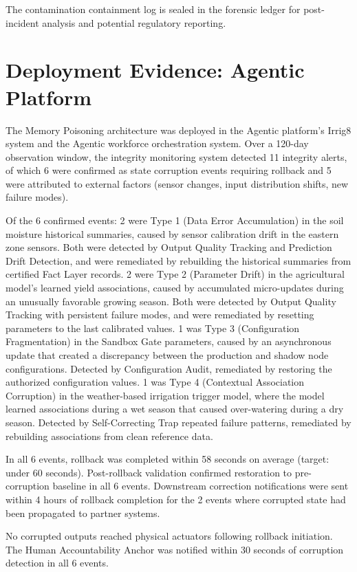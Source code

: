 \documentclass[12pt]{article}
\begin{document}
The contamination containment log is sealed in the forensic ledger for post-incident analysis and potential regulatory reporting.

\section{Deployment Evidence: Agentic Platform}
The Memory Poisoning architecture was deployed in the Agentic platform's Irrig8 system and the Agentic workforce orchestration system. Over a 120-day observation window, the integrity monitoring system detected 11 integrity alerts, of which 6 were confirmed as state corruption events requiring rollback and 5 were attributed to external factors (sensor changes, input distribution shifts, new failure modes).

Of the 6 confirmed events: 2 were Type 1 (Data Error Accumulation) in the soil moisture historical summaries, caused by sensor calibration drift in the eastern zone sensors. Both were detected by Output Quality Tracking and Prediction Drift Detection, and were remediated by rebuilding the historical summaries from certified Fact Layer records. 2 were Type 2 (Parameter Drift) in the agricultural model's learned yield associations, caused by accumulated micro-updates during an unusually favorable growing season. Both were detected by Output Quality Tracking with persistent failure modes, and were remediated by resetting parameters to the last calibrated values. 1 was Type 3 (Configuration Fragmentation) in the Sandbox Gate parameters, caused by an asynchronous update that created a discrepancy between the production and shadow node configurations. Detected by Configuration Audit, remediated by restoring the authorized configuration values. 1 was Type 4 (Contextual Association Corruption) in the weather-based irrigation trigger model, where the model learned associations during a wet season that caused over-watering during a dry season. Detected by Self-Correcting Trap repeated failure patterns, remediated by rebuilding associations from clean reference data.

In all 6 events, rollback was completed within 58 seconds on average (target: under 60 seconds). Post-rollback validation confirmed restoration to pre-corruption baseline in all 6 events. Downstream correction notifications were sent within 4 hours of rollback completion for the 2 events where corrupted state had been propagated to partner systems.

No corrupted outputs reached physical actuators following rollback initiation. The Human Accountability Anchor was notified within 30 seconds of corruption detection in all 6 events.
\end{document}
